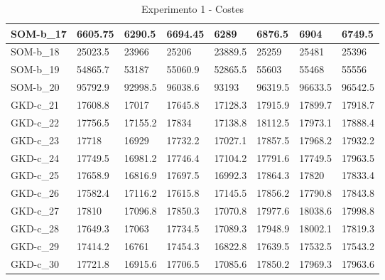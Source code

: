 \documentclass[11pt,a4paper]{article}
\begin{document}
\begin{table}[H]
\begin{tabular}{l|l|l|l|l|l|l|l|}
			\multicolumn{1}{|l|}{SOM-b\_17} & 6605.75 & 6290.5  & 6694.45 & 6289    & 6876.5  & 6904    & 6749.5  \\ \hline
			\multicolumn{1}{|l|}{SOM-b\_18} & 25023.5 & 23966   & 25206   & 23889.5 & 25259   & 25481   & 25396   \\ \hline
			\multicolumn{1}{|l|}{SOM-b\_19} & 54865.7 & 53187   & 55060.9 & 52865.5 & 55603   & 55468   & 55556   \\ \hline
			\multicolumn{1}{|l|}{SOM-b\_20} & 95792.9 & 92998.5 & 96038.6 & 93193   & 96319.5 & 96633.5 & 96542.5 \\ \hline
			\multicolumn{1}{|l|}{GKD-c\_21} & 17608.8 & 17017   & 17645.8 & 17128.3 & 17915.9 & 17899.7 & 17918.7 \\ \hline
			\multicolumn{1}{|l|}{GKD-c\_22} & 17756.5 & 17155.2 & 17834   & 17138.8 & 18112.5 & 17973.1 & 17888.4 \\ \hline
			\multicolumn{1}{|l|}{GKD-c\_23} & 17718   & 16929   & 17732.2 & 17027.1 & 17857.5 & 17968.2 & 17932.2 \\ \hline
			\multicolumn{1}{|l|}{GKD-c\_24} & 17749.5 & 16981.2 & 17746.4 & 17104.2 & 17791.6 & 17749.5 & 17963.5 \\ \hline
			\multicolumn{1}{|l|}{GKD-c\_25} & 17658.9 & 16816.9 & 17697.5 & 16992.3 & 17864.3 & 17820   & 17833.4 \\ \hline
			\multicolumn{1}{|l|}{GKD-c\_26} & 17582.4 & 17116.2 & 17615.8 & 17145.5 & 17856.2 & 17790.8 & 17843.8 \\ \hline
			\multicolumn{1}{|l|}{GKD-c\_27} & 17810   & 17096.8 & 17850.3 & 17070.8 & 17977.6 & 18038.6 & 17998.8 \\ \hline
			\multicolumn{1}{|l|}{GKD-c\_28} & 17649.3 & 17063   & 17734.5 & 17089.3 & 17948.9 & 18002.1 & 17819.3 \\ \hline
			\multicolumn{1}{|l|}{GKD-c\_29} & 17414.2 & 16761   & 17454.3 & 16822.8 & 17639.5 & 17532.5 & 17543.2 \\ \hline
			\multicolumn{1}{|l|}{GKD-c\_30} & 17721.8 & 16915.6 & 17706.5 & 17085.6 & 17850.2 & 17969.3 & 17963.6 \\ \hline
		\end{tabular}
		\caption{ Experimento 1 - Costes }
		\label{211}
	\end{table}
\end{document}

